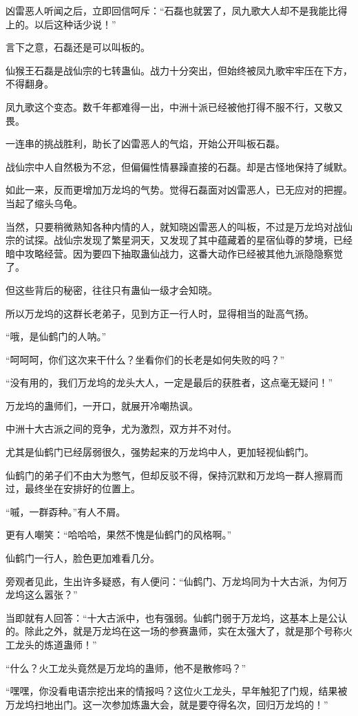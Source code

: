 \begin{this_body}
凶雷恶人听闻之后，立即回信呵斥：“石磊也就罢了，凤九歌大人却不是我能比得上的。以后这种话少说！”

言下之意，石磊还是可以叫板的。

仙猴王石磊是战仙宗的七转蛊仙。战力十分突出，但始终被凤九歌牢牢压在下方，不得翻身。

凤九歌这个变态。数千年都难得一出，中洲十派已经被他打得不服不行，又敬又畏。

一连串的挑战胜利，助长了凶雷恶人的气焰，开始公开叫板石磊。

战仙宗中人自然极为不忿，但偏偏性情暴躁直接的石磊。却是古怪地保持了缄默。

如此一来，反而更增加万龙坞的气势。觉得石磊面对凶雷恶人，已无应对的把握。当起了缩头乌龟。

当然，只要稍微熟知各种内情的人，就知晓凶雷恶人的叫板，不过是万龙坞对战仙宗的试探。战仙宗发现了繁星洞天，又发现了其中蕴藏着的星宿仙尊的梦境，已经暗中攻略经营。因为要四下抽取蛊仙战力，这番大动作已经被其他九派隐隐察觉了。

但这些背后的秘密，往往只有蛊仙一级才会知晓。

所以万龙坞的这群长老弟子，见到方正一行人时，显得相当的趾高气扬。

“哦，是仙鹤门的人呐。”

“呵呵呵，你们这次来干什么？坐看你们的长老是如何失败的吗？”

“没有用的，我们万龙坞的龙头大人，一定是最后的获胜者，这点毫无疑问！”

万龙坞的蛊师们，一开口，就展开冷嘲热讽。

中洲十大古派之间的竞争，尤为激烈，双方并不对付。

尤其是仙鹤门已经孱弱很久，强势起来的万龙坞中人，更加轻视仙鹤门。

仙鹤门的弟子们不由大为憋气，但却反驳不得，保持沉默和万龙坞一群人擦肩而过，最终坐在安排好的位置上。

“嘁，一群孬种。”有人不屑。

更有人嘲笑：“哈哈哈，果然不愧是仙鹤门的风格啊。”

仙鹤门一行人，脸色更加难看几分。

旁观者见此，生出许多疑惑，有人便问：“仙鹤门、万龙坞同为十大古派，为何万龙坞这么嚣张？”

当即就有人回答：“十大古派中，也有强弱。仙鹤门弱于万龙坞，这基本上是公认的。除此之外，就是万龙坞在这一场的参赛蛊师，实在太强大了，就是那个号称火工龙头的炼道蛊师！”

“什么？火工龙头竟然是万龙坞的蛊师，他不是散修吗？”

“嘿嘿，你没看电语宗挖出来的情报吗？这位火工龙头，早年触犯了门规，结果被万龙坞扫地出门。这一次参加炼蛊大会，就是要夺得名次，回归万龙坞的！”


\end{this_body}
